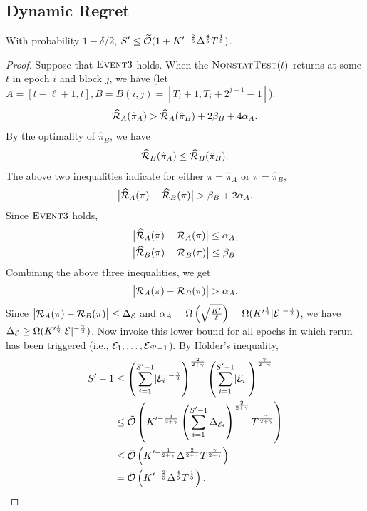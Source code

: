 \subsection{Dynamic Regret}
\begin{lemma}
\label{lemma:dynamic S not much}
With probability $1-\delta/2$, $S^\prime \leq \widetilde{\mathcal{O}}(1+K^{\prime -\frac{2}{5}}\Delta^{\frac{4}{5}}T^{\frac{1}{5}})$.
\end{lemma}
\begin{proof}
Suppose that $\textsc{Event} 3$ holds. When the $\textsc{NonstatTest}(t)$ returns \true at some $t$ in epoch $i$ and  block $j$, we have (let $A=[t-\ell+1,t], B=B(i,j)=[T_i+1, T_i+2^{j-1}-1]$):
\begin{align*}
\widehat{\cal{R}}_{A}(\hat{\pi}_{A}) > \widehat{\cal{R}}_{A}(\hat{\pi}_{B})+2\beta_{B} + 4\alpha_{A}. 
\end{align*} 
By the optimality of $\hat{\pi}_{B}$, we have
\begin{align*}
\widehat{\cal{R}}_{B}(\hat{\pi}_{A}) \leq \widehat{\cal{R}}_{B}(\hat{\pi}_{B}).
\end{align*}
The above two inequalities indicate for either $\pi=\hat{\pi}_{A}$ or $\pi=\hat{\pi}_{B}$, 
\begin{align*}
\big\lvert\widehat{\cal{R}}_{A}(\pi) - \widehat{\cal{R}}_{B}(\pi)\big\rvert > \beta_{B} + 2\alpha_{A}.
\end{align*}
Since $\textsc{Event} 3$ holds, 
\begin{gather*}
\big\lvert\widehat{\cal{R}}_{A}(\pi)-{\mathcal{R}}_{A}(\pi)\big\rvert\leq \alpha_{A},\\
\big\lvert\widehat{\cal{R}}_{B}(\pi)-{\mathcal{R}}_{B}(\pi)\big\rvert\leq \beta_{B}. 
\end{gather*}
Combining the above three inequalities, we get
\begin{align*}
\big\lvert{\mathcal{R}}_{A}(\pi)-{\mathcal{R}}_{B}(\pi)\big\rvert>\alpha_{A}. 
\end{align*}
Since $\big\lvert{\mathcal{R}}_{A}(\pi)-{\mathcal{R}}_{B}(\pi)\big\rvert\leq \Delta_{{\mathcal{E}}}$ and $\alpha_{A}=\Omega\left(\sqrt{\frac{K^\prime}{\ell}}\right)=\Omega(K^{\prime \frac{1}{2}}\lvert{\mathcal{E}}\rvert^{-\frac{\gamma}{2}})$, we have $\Delta_{{\mathcal{E}}}\geq \Omega(K^{\prime \frac{1}{2}}\lvert{\mathcal{E}}\rvert^{-\frac{\gamma}{2}})$. Now invoke this lower bound for all epochs in which rerun has been triggered (i.e., ${\mathcal{E}}_1, \ldots, {\mathcal{E}}_{S'-1}$). By H\"{o}lder's inequality, 
\begin{align*}
S^\prime-1 
&\leq \left(\sum_{i=1}^{S^\prime-1} \lvert{\mathcal{E}}_i\rvert^{-\frac{\gamma}{2}} \right)^{\frac{2}{2+\gamma}} \left(\sum_{i=1}^{S^\prime-1} \lvert{\mathcal{E}}_i\rvert \right)^{\frac{\gamma}{2+\gamma}} \\
&\leq \tilde{\mathcal{O}}\left(K^{\prime -\frac{1}{2+\gamma}}\left(\sum_{i=1}^{S'-1}\Delta_{{\mathcal{E}}_i} \right)^{\frac{2}{2+\gamma}} T^{\frac{\gamma}{2+\gamma}} \right)  \\
&\leq \tilde{\mathcal{O}}\left(K^{\prime -\frac{1}{2+\gamma}} \Delta^{\frac{2}{2+\gamma}} T^{\frac{\gamma}{2+\gamma}} \right)  \\
&= \tilde{\mathcal{O}}\left( K^{\prime -\frac{2}{5}}\Delta^{\frac{4}{5}} T^{\frac{1}{5}} \right). 
\end{align*}
\end{proof}

